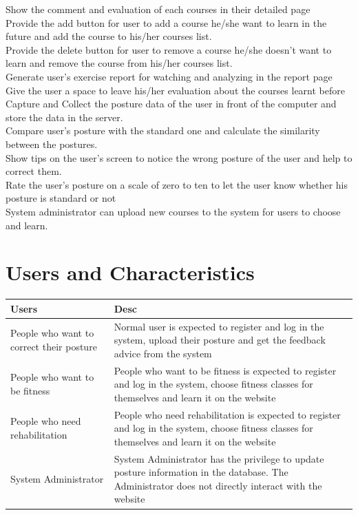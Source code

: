 \documentclass[16pt]{scrreprt}
\begin{document}
 
Show the comment and evaluation of each courses in their detailed page\\

 
Provide the add button for user to add a course he/she want to learn in the future and add the course to his/her courses list.\\

 
Provide the delete button for user to remove a course he/she doesn't want to learn and remove the course from his/her courses list.\\


Generate user's exercise report for watching and analyzing in the report page\\
 
Give the user a space to leave his/her evaluation about the courses learnt before\\

Capture and Collect the posture data of the user in front of the computer and store the data in the server.\\


Compare user's posture with the standard one and calculate the similarity between the postures.\\


Show tips on the user's screen to notice the wrong posture of the user and help to correct them.\\


Rate the user's posture on a scale of zero to ten to let the user know whether his posture is standard or not\\


System administrator can upload new courses to the system for users to choose and learn.\\

\section{Users and Characteristics}

 
\begin{center}
    \begin{tabular}{p{5cm}p{11cm}}
        \hline
	    Users & Desc\\
        \hline
	    People who want to correct their posture &  Normal user is expected to register and log in the system, upload their posture and get the feedback advice from the system\\
        \hline
	    People who want to be fitness & People who want to be fitness is expected to register and log in the system, choose fitness classes for themselves and learn it on the website\\
        \hline
        People who need rehabilitation & People who need rehabilitation is expected to register and log in the system, choose fitness classes for themselves and learn it on the website\\
        \hline
        System Administrator & System Administrator has the privilege to update posture information in the database. The Administrator does not directly interact with the website\\
        \hline
    \end{tabular}
\end{center}
\end{document}
